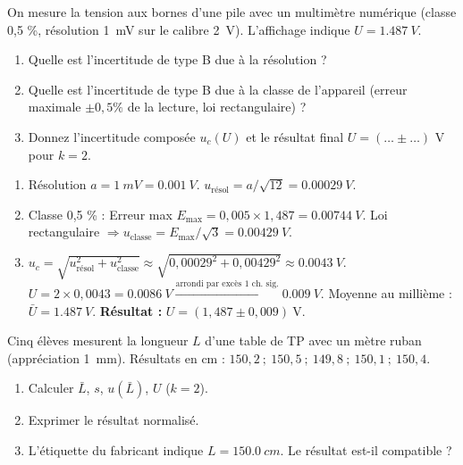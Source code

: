 \documentclass[11pt]{article}
\begin{document}
\begin{exercice}
On mesure la tension aux bornes d'une pile avec un multimètre numérique (classe 0,5 \%, résolution \SI{1}{mV} sur le calibre \SI{2}{V}). L'affichage indique $U = \SI{1,487}{V}$.
\begin{enumerate}
\item Quelle est l'incertitude de type B due à la résolution ?
\item Quelle est l'incertitude de type B due à la classe de l'appareil (erreur maximale $\pm 0,5\%$ de la lecture, loi rectangulaire) ?
\item Donnez l'incertitude composée $u_c(U)$ et le résultat final $U = (\dots \pm \dots)$ V pour $k=2$.
\end{enumerate}
\end{exercice}

\begin{corrige}[Exercice 1]
\begin{enumerate}
\item Résolution $a = \SI{1}{mV} = \SI{0,001}{V}$. $u_{\text{résol}} = a/\sqrt{12} = \SI{0,00029}{V}$.
\item Classe 0,5 \% : Erreur max $E_{\text{max}} = 0,005 \times 1,487 = \SI{0,00744}{V}$. Loi rectangulaire $\Rightarrow u_{\text{classe}} = E_{\text{max}}/\sqrt{3} = \SI{0,00429}{V}$.
\item $u_c = \sqrt{u_{\text{résol}}^2 + u_{\text{classe}}^2} \approx \sqrt{0,00029^2 + 0,00429^2} \approx \SI{0,0043}{V}$.
$U = 2 \times 0,0043 = \SI{0,0086}{V} \xrightarrow{\text{arrondi par excès 1 ch. sig.}} \SI{0,009}{V}$.
Moyenne au millième : $\bar{U} = \SI{1,487}{V}$.
\textbf{Résultat :} $\boxed{U = (1,487 \pm 0,009)\ \text{V}}$.
\end{enumerate}
\end{corrige}

\begin{exercice}
Cinq élèves mesurent la longueur $L$ d'une table de TP avec un mètre ruban (appréciation \SI{1}{mm}). Résultats en cm : $150,2\ ;\ 150,5\ ;\ 149,8\ ;\ 150,1\ ;\ 150,4$.
\begin{enumerate}
\item Calculer $\bar{L}$, $s$, $u(\bar{L})$, $U$ ($k=2$).
\item Exprimer le résultat normalisé.
\item L'étiquette du fabricant indique $L = \SI{150,0}{cm}$. Le résultat est-il compatible ?
\end{enumerate}
\end{exercice}
\end{document}
